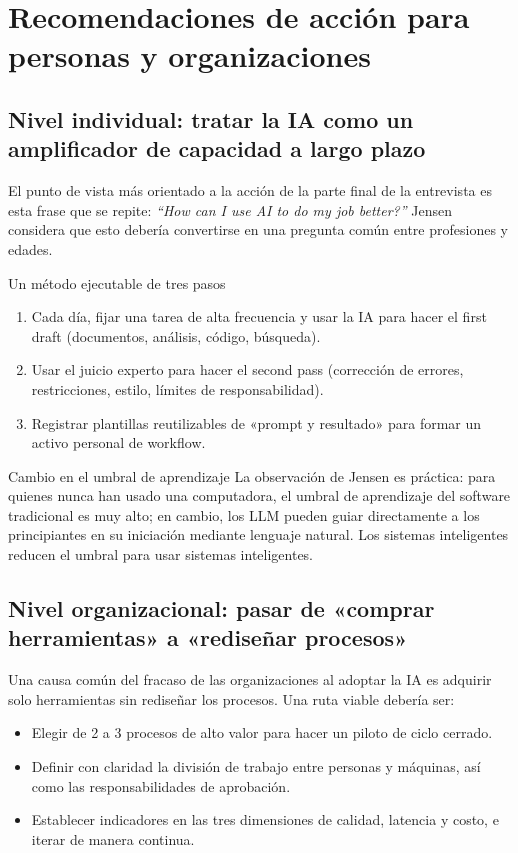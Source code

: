 \documentclass[a4paper]{article}
\begin{document}
\section{Recomendaciones de acción para personas y organizaciones}

\subsection{Nivel individual: tratar la IA como un amplificador de capacidad a largo plazo}

El punto de vista más orientado a la acción de la parte final de la entrevista es esta frase que se repite: \textit{``How can I use AI to do my job better?''} Jensen considera que esto debería convertirse en una pregunta común entre profesiones y edades.

\begin{knowledgebox}{Un método ejecutable de tres pasos}
\begin{enumerate}
    \item Cada día, fijar una tarea de alta frecuencia y usar la IA para hacer el first draft (documentos, análisis, código, búsqueda).
    \item Usar el juicio experto para hacer el second pass (corrección de errores, restricciones, estilo, límites de responsabilidad).
    \item Registrar plantillas reutilizables de «prompt y resultado» para formar un activo personal de workflow.
\end{enumerate}
\end{knowledgebox}

\begin{importantbox}{Cambio en el umbral de aprendizaje}
La observación de Jensen es práctica: para quienes nunca han usado una computadora, el umbral de aprendizaje del software tradicional es muy alto; en cambio, los LLM pueden guiar directamente a los principiantes en su iniciación mediante lenguaje natural. Los sistemas inteligentes reducen el umbral para usar sistemas inteligentes.
\end{importantbox}

\subsection{Nivel organizacional: pasar de «comprar herramientas» a «rediseñar procesos»}

Una causa común del fracaso de las organizaciones al adoptar la IA es adquirir solo herramientas sin rediseñar los procesos. Una ruta viable debería ser:
\begin{itemize}
    \item Elegir de 2 a 3 procesos de alto valor para hacer un piloto de ciclo cerrado.
    \item Definir con claridad la división de trabajo entre personas y máquinas, así como las responsabilidades de aprobación.
    \item Establecer indicadores en las tres dimensiones de calidad, latencia y costo, e iterar de manera continua.
\end{itemize}
\end{document}
